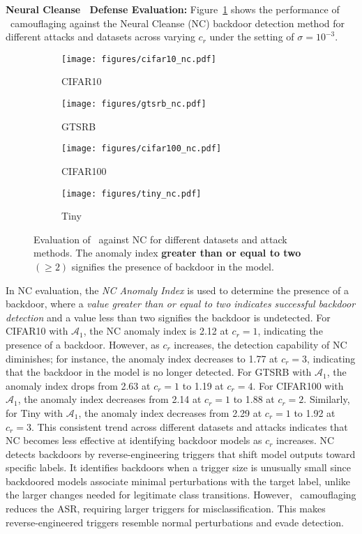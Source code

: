 \vspace{0.15cm}
\noindent \textbf{Neural Cleanse~\cite{nc} Defense Evaluation:} Figure~\ref{fig:nc} shows the performance of \methodname~camouflaging against the Neural Cleanse (NC) backdoor detection method for different attacks and datasets across varying $c_{r}$ under the setting of $\sigma = 10^{-3}$.
\begin{figure}[!t]
    \centering
    \begin{subfigure}{0.48\linewidth}
        \centering
        \texttt{[image: figures/cifar10\_nc.pdf]}
        \caption{CIFAR10}
    \end{subfigure}\hspace{0.1cm}
    \begin{subfigure}{0.48\linewidth}
        \centering
        \texttt{[image: figures/gtsrb\_nc.pdf]}
        \caption{GTSRB}
    \end{subfigure}
    \begin{subfigure}{0.48\linewidth}
        \centering
        \texttt{[image: figures/cifar100\_nc.pdf]}
        \caption{CIFAR100}
    \end{subfigure}\hspace{0.1cm}
    \begin{subfigure}{0.48\linewidth}
        \centering
        \texttt{[image: figures/tiny\_nc.pdf]}
        \caption{Tiny}
    \end{subfigure}
    \caption{Evaluation of \methodname~against NC for different datasets and attack methods. The anomaly index \textbf{greater than or equal to two} $(\geq 2)$ signifies the presence of backdoor in the model.}
    \label{fig:nc}
\end{figure}
In NC evaluation, the \textit{NC Anomaly Index} is used to determine the presence of a backdoor, where a \textit{value greater than or equal to two indicates successful backdoor detection} and a value less than two signifies the backdoor is undetected. For CIFAR10 with $\mathcal{A}_1$, the NC anomaly index is 2.12 at $c_r = 1$, indicating the presence of a backdoor. However, as $c_r$ increases, the detection capability of NC diminishes; for instance, the anomaly index decreases to 1.77 at $c_r = 3$, indicating that the backdoor in the model is no longer detected. For GTSRB with $\mathcal{A}_1$, the anomaly index drops from 2.63 at $c_r = 1$ to 1.19 at $c_r = 4$. For CIFAR100 with $\mathcal{A}_1$, the anomaly index decreases from 2.14 at $c_r = 1$ to 1.88 at $c_r = 2$. Similarly, for Tiny with $\mathcal{A}_1$, the anomaly index decreases from 2.29 at $c_r = 1$ to 1.92 at $c_r = 3$. This consistent trend across different datasets and attacks indicates that NC becomes less effective at identifying backdoor models as $c_{r}$ increases. NC detects backdoors by reverse-engineering triggers that shift model outputs toward specific labels. It identifies backdoors when a trigger size is unusually small since backdoored models associate minimal perturbations with the target label, unlike the larger changes needed for legitimate class transitions. However, \methodname~camouflaging reduces the ASR, requiring larger triggers for misclassification. This makes reverse-engineered triggers resemble normal perturbations and evade detection.

